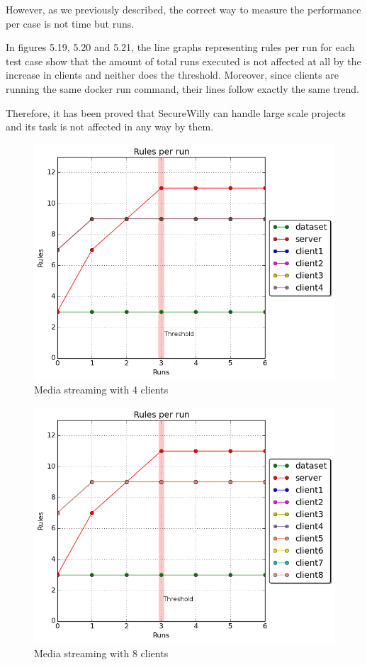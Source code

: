 However, as we previously described, the correct way to measure the performance per case is not time but runs.

In figures 5.19, 5.20 and 5.21, the line graphs representing rules per run for each test case show that the amount of total runs executed is not affected at all by the increase in clients and neither does the threshold. Moreover, since clients are running the same docker run command, their lines follow exactly the same trend.

Therefore, it has been proved that SecureWilly can handle large scale projects and its task is not affected in any way by them.

\begin{figure}[h!]
  \centering
   \includegraphics[width=0.65\linewidth]{./figures/scalability/rules_4_t.png}
   \caption{Media streaming with 4 clients}
\end{figure}
\hfill\break\hfill\break
\begin{figure}[h!]
  \centering
   \includegraphics[width=0.68\linewidth]{./figures/scalability/rules_8_t.png}
   \caption{Media streaming with 8 clients}
\end{figure}
\hfill\break\hfill\break\hfill\break\hfill\break

